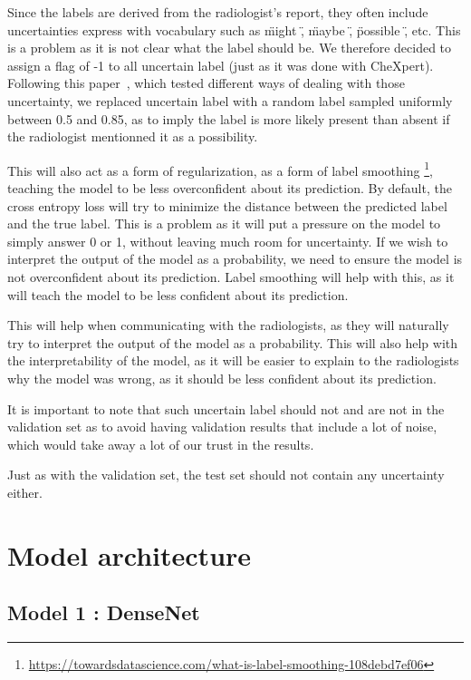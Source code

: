 \documentclass[11pt]{article}
\begin{document}
        Since the labels are derived from the radiologist's report, they often include uncertainties express with vocabulary such as \" might \" , \" maybe \" , \" possible \" , etc.
        This is a problem as it is not clear what the label should be. We therefore decided to assign a flag of -1 to all uncertain label (just as it was done with CheXpert). Following this paper~\cite{hierarchical}, which tested different
        ways of dealing with those uncertainty, we replaced uncertain label with a random label sampled uniformly between 0.5 and 0.85, as to imply the label is more likely present than absent if the radiologist
        mentionned it as a possibility.

        This will also act as a form of regularization, as a form of label smoothing \footnote{\url{https://towardsdatascience.com/what-is-label-smoothing-108debd7ef06}}, teaching the model to
        be less overconfident about its prediction. By default, the cross entropy loss will try to minimize the distance between the predicted label and the true label. This is a problem as it will
        put a pressure on the model to simply answer 0 or 1, without leaving much room for uncertainty. If we wish to interpret the
        output of the model as a probability, we need to ensure the model is not overconfident about its prediction. Label smoothing will help with this, as it will teach the model to be less confident about its prediction.

        This will help when communicating with the radiologists, as they will naturally try to interpret the output of the model as a probability. This will also help with the interpretability of the model, as it will
        be easier to explain to the radiologists why the model was wrong, as it should be less confident about its prediction.

        It is important to note that such uncertain label should not and are not in the validation set as to avoid having validation results that include a lot of noise, which would take away a lot of our trust
        in the results.

        Just as with the validation set, the test set should not contain any uncertainty either.

    \section{Model architecture}

    \subsection{Model 1 : DenseNet}
\end{document}
